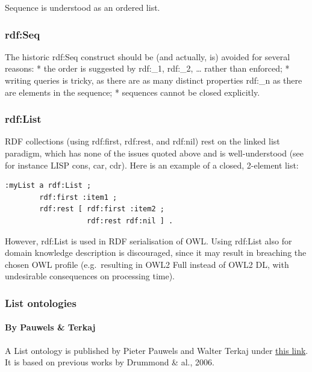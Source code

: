 \documentclass[
  11pt,
]{article}
\begin{document}
Sequence is understood as an ordered list.

\hypertarget{rdfseq}{%
\subsubsection{rdf:Seq}\label{rdfseq}}

The historic rdf:Seq construct should be (and actually, is) avoided for
several reasons: * the order is suggested by rdf:\_1, rdf:\_2, \ldots{}
rather than enforced; * writing queries is tricky, as there are as many
distinct properties rdf:\_n as there are elements in the sequence; *
sequences cannot be closed explicitly.

\hypertarget{rdflist}{%
\subsubsection{rdf:List}\label{rdflist}}

RDF collections (using rdf:first, rdf:rest, and rdf:nil) rest on the
linked list paradigm, which has none of the issues quoted above and is
well-understood (see for instance LISP cons, car, cdr). Here is an
example of a closed, 2-element list:

\begin{verbatim}
:myList a rdf:List ;
        rdf:first :item1 ;
        rdf:rest [ rdf:first :item2 ;
                   rdf:rest rdf:nil ] .
\end{verbatim}

However, rdf:List is used in RDF serialisation of OWL. Using rdf:List
also for domain knowledge description is discouraged, since it may
result in breaching the chosen OWL profile (e.g.~resulting in OWL2 Full
instead of OWL2 DL, with undesirable consequences on processing time).

\hypertarget{list-ontologies}{%
\subsubsection{List ontologies}\label{list-ontologies}}

\hypertarget{by-pauwels-terkaj}{%
\paragraph{By Pauwels \& Terkaj}\label{by-pauwels-terkaj}}

A List ontology is published by Pieter Pauwels and Walter Terkaj under
\href{https://pi.pauwel.be/evoc/list_W3ID/20151211/index.html}{this
link}. It is based on previous works by Drummond \& al., 2006.
\end{document}
